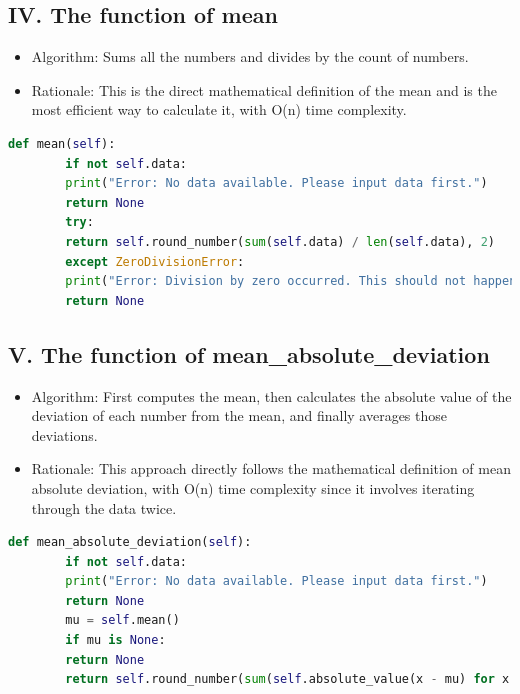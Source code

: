 \documentclass[english,12pt,a4paper]{report}
\begin{document}
	
	\subsection*{IV. The function of mean}
	\begin{itemize}[leftmargin=*]
		\item Algorithm: Sums all the numbers and divides by the count of numbers.
		\item Rationale: This is the direct mathematical definition of the mean and is the most efficient way to calculate it, with O(n) time complexity.
	\end{itemize}
	\begin{lstlisting}[language=Python, caption=Mean Method]
		def mean(self):
		if not self.data:
		print("Error: No data available. Please input data first.")
		return None
		try:
		return self.round_number(sum(self.data) / len(self.data), 2)
		except ZeroDivisionError:
		print("Error: Division by zero occurred. This should not happen.")
		return None
	\end{lstlisting}
		
	
	\subsection*{V. The function of mean\_absolute\_deviation}
	\begin{itemize}[leftmargin=*]
		\item Algorithm: First computes the mean, then calculates the absolute value of the deviation of each number from the mean, and finally averages those deviations.
		\item Rationale: This approach directly follows the mathematical definition of mean absolute deviation, with O(n) time complexity since it involves iterating through the data twice.
	\end{itemize}
	\begin{lstlisting}[language=Python, caption=Mean Absolute Deviation Method]
		def mean_absolute_deviation(self):
		if not self.data:
		print("Error: No data available. Please input data first.")
		return None
		mu = self.mean()
		if mu is None:
		return None
		return self.round_number(sum(self.absolute_value(x - mu) for x in self.data) / len(self.data), 2)
	\end{lstlisting}
	
	
\end{document}
